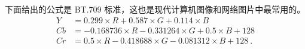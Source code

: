 
下面给出的公式是 BT.709 标准，这也是现代计算机图像和网络图片中最常用的。
\begin{equation}
\begin{aligned}
Y &= 0.299 \times R + 0.587 \times G + 0.114 \times B \\
Cb &= -0.168736 \times R - 0.331264 \times G + 0.5 \times B + 128 \\
Cr &= 0.5 \times R - 0.418688 \times G - 0.081312 \times B + 128~.
\end{aligned}
\end{equation}
